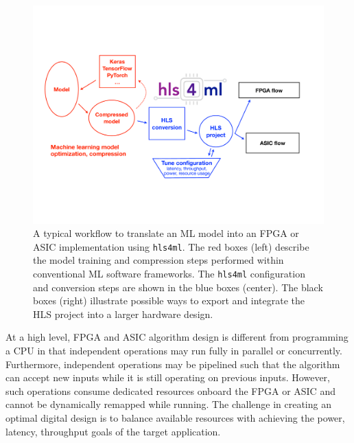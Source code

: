 \documentclass[tinyml]{acmart}
\newcommand{\hlsfml}{\texttt{hls4ml}\xspace}
\begin{document}
\begin{figure}[t!]
\begin{center}
\includegraphics[width=0.99\columnwidth]{Figs/hls4ml-flow-4.pdf}
\end{center}
\caption{A typical workflow to translate an ML model into an FPGA or ASIC implementation using \hlsfml.
The red boxes (left) describe the model training and compression steps performed within conventional ML software frameworks.
The \hlsfml configuration and conversion steps are shown in the blue boxes (center).
The black boxes (right) illustrate possible ways to export and integrate the HLS project into a larger hardware design.}
\label{fig:flow}
\end{figure}

At a high level, FPGA and ASIC algorithm design is different from programming a CPU in that independent operations may run fully in parallel or concurrently.
Furthermore, independent operations may be pipelined such that the algorithm can accept new inputs while it is still operating on previous inputs.
However, such operations consume dedicated resources onboard the FPGA or ASIC and cannot be dynamically remapped while running.
The challenge in creating an optimal digital design is to balance available resources with achieving the power, latency, throughput goals of the target application.


\end{document}
